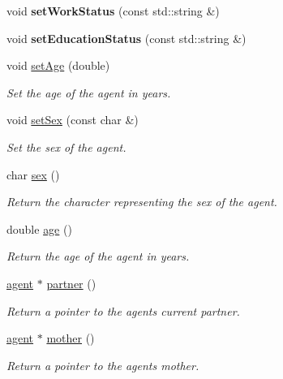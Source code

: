 \begin{DoxyCompactItemize}
\item 
\mbox{\label{classagent_a66caa39215e0fba347152cbf7190c85e}} 
void {\bfseries set\+Work\+Status} (const std\+::string \&)
\item 
\mbox{\label{classagent_afbfba46faf7104f44f19dfef8dd72585}} 
void {\bfseries set\+Education\+Status} (const std\+::string \&)
\item 
void \mbox{\hyperlink{classagent_ad5a0596438a813a44840ad542416dc50}{set\+Age}} (double)
\begin{DoxyCompactList}\small\item\em Set the age of the agent in years. \end{DoxyCompactList}\item 
void \mbox{\hyperlink{classagent_aaeb64899916c47b42bfdfbc43427d9a8}{set\+Sex}} (const char \&)
\begin{DoxyCompactList}\small\item\em Set the sex of the agent. \end{DoxyCompactList}\item 
char \mbox{\hyperlink{classagent_a0c0cbe17943c2fc044905fe877b14ade}{sex}} ()
\begin{DoxyCompactList}\small\item\em Return the character representing the sex of the agent. \end{DoxyCompactList}\item 
double \mbox{\hyperlink{classagent_a1f8475f933cfae0199d73c108faff1ad}{age}} ()
\begin{DoxyCompactList}\small\item\em Return the age of the agent in years. \end{DoxyCompactList}\item 
\mbox{\hyperlink{classagent}{agent}} $\ast$ \mbox{\hyperlink{classagent_a1e9532f2be4b2b08ee7cdd2a7761237b}{partner}} ()
\begin{DoxyCompactList}\small\item\em Return a pointer to the agent\textquotesingle{}s current partner. \end{DoxyCompactList}\item 
\mbox{\hyperlink{classagent}{agent}} $\ast$ \mbox{\hyperlink{classagent_a6853ae2b9f4b349bd748105699dd43e4}{mother}} ()
\begin{DoxyCompactList}\small\item\em Return a pointer to the agent\textquotesingle{}s mother. \end{DoxyCompactList}\item 

\end{DoxyCompactItemize}
